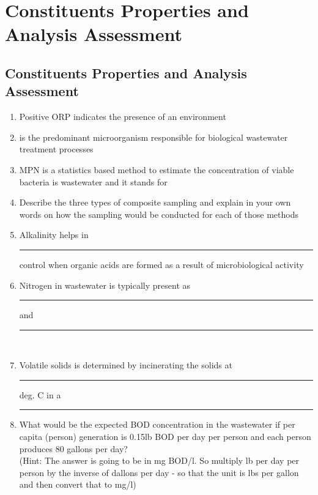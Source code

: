 
\chapter{Constituents Properties and Analysis Assessment}

\section*{Constituents Properties and Analysis Assessment}

\begin{enumerate}

\item Positive ORP indicates the presence of an {\underline{\hspace{1cm}}} environment \\

\item {\underline{\hspace{1cm}}} is the predominant microorganism responsible for biological wastewater treatment processes \\

\item MPN is a statistics based method to estimate the concentration of viable bacteria is wastewater and it stands for {\underline{\hspace{1cm}}} \\

\item Describe the three types of composite sampling and explain in your own words on how the sampling would be conducted for each of those methods\\

\item Alkalinity helps in \rule{1.5cm}{0.3mm}control when organic acids are formed as a result of microbiological activity\\

\item Nitrogen in wastewater is typically present as \rule{1.5cm}{0.3mm} and \rule{1.5cm}{0.3mm}\\

\item Volatile solids is determined by incinerating the solids at \rule{1.5cm}{0.3mm} deg. C in a \rule{1.5cm}{0.3mm}

\item  What would be the expected BOD concentration in the wastewater if per capita (person) generation is 0.15lb BOD per day per person and each person produces 80 gallons per day?\\
(Hint: The answer is going to be in mg BOD/l. So multiply lb per day per person by the inverse of dallons per day - so that the unit is lbs per gallon and then convert that to mg/l)\\



\end{enumerate}
